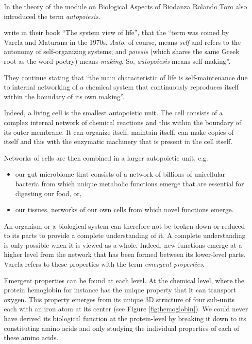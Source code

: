\documentclass[
  11pt,
]{book}
\providecommand{\tightlist}{%
  \setlength{\itemsep}{0pt}\setlength{\parskip}{0pt}}
\begin{document}
In the theory of the module on Biological Aspects of Biodanza Rolando Toro also introduced the term \emph{autopoiesis}.

\citet{capraLuisi2014} write in their book ``The system view of life'', that the ``term was coined by Varela and Maturana in the 1970s. \emph{Auto}, of course, means \emph{self} and refers to the autonomy of self-organizing systems; and \emph{poiesis} (which shares the same Greek root as the word poetry) means \emph{making}. So, \emph{autopoiesis} means self-making''.

They continue stating that ``the main characteristic of life is self-maintenance due to internal networking of a chemical system that continuously reproduces itself within the boundary of its own making''.

Indeed, a living cell is the smallest autopoietic unit.
The cell consists of a complex internal network of chemical reactions and this within the boundary of its outer membrane.
It can organize itself, maintain itself, can make copies of itself and this with the enzymatic machinery that is present in the cell itself.

Networks of cells are then combined in a larger autopoietic unit, e.g.~

\begin{itemize}
\tightlist
\item
  our gut microbiome that consists of a network of billions of unicellular bacteria from which unique metabolic functions emerge that are essential for digesting our food, or,
\item
  our tissues, networks of our own cells from which novel functions emerge.
\end{itemize}

An organism or a biological system can therefore not be broken down or reduced to its parts to provide a complete understanding of it. A complete understanding is only possible when it is viewed as a whole.
Indeed, new functions emerge at a higher level from the network that has been formed between its lower-level parts. Varela refers to these properties with the term \emph{emergent properties}.

Emergent properties can be found at each level. At the chemical level, where the protein hemoglobin for instance has the unique property that it can transport oxygen. This property emerges from its unique 3D structure of four sub-units each with an iron atom at its center (see Figure \ref{fig:hemoglobin}). We could never have derived its biological function at the protein-level by breaking it down to its constituting amino acids and only studying the individual properties of each of these amino acids.
\end{document}
